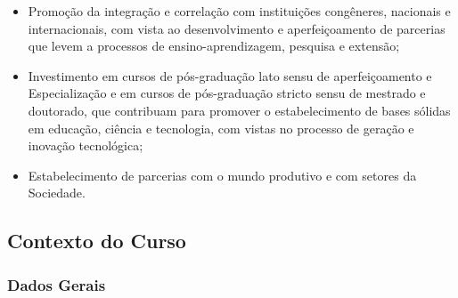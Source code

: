 \begin{itemize}
  \item Promoção da integração e correlação com instituições congêneres, nacionais e internacionais, com vista ao desenvolvimento e aperfeiçoamento de parcerias que levem a processos de ensino-aprendizagem, pesquisa e extensão;
  \item Investimento em cursos de pós-graduação lato sensu de aperfeiçoamento e Especialização e em cursos de pós-graduação stricto sensu de mestrado e doutorado, que contribuam para promover o estabelecimento de bases sólidas em educação, ciência e tecnologia, com vistas no processo de geração e inovação tecnológica;
  \item Estabelecimento de parcerias com o mundo produtivo e com setores da Sociedade.
\end{itemize}

\subsection{Contexto do Curso}


\subsubsection{Dados Gerais}

